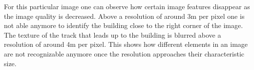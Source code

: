 For this particular image one can observe how certain image features disappear as the image quality is decreased. Above a resolution of around 3m per pixel one is not able anymore to identify the building close to the right corner of the image. 
The texture of the track that leads up to the building is blurred above a resolution of around 4m per pixel. This shows how different elements in an image are not recognizable anymore once the resolution approaches their characteristic size.



